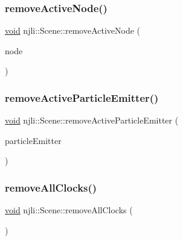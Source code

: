\mbox{\label{classnjli_1_1_scene_a5a826df53ef02ccb6bdcd7969c186162}} 
\subsubsection{\texorpdfstring{remove\+Active\+Node()}{removeActiveNode()}}
{\footnotesize\ttfamily \mbox{\hyperlink{_thread_8h_af1e856da2e658414cb2456cb6f7ebc66}{void}} njli\+::\+Scene\+::remove\+Active\+Node (\begin{DoxyParamCaption}\item[{\mbox{\hyperlink{classnjli_1_1_node}{Node}} $\ast$}]{node }\end{DoxyParamCaption})\hspace{0.3cm}{\ttfamily [protected]}}

\mbox{\label{classnjli_1_1_scene_a09172111155b23406c7110982fbce2bc}} 
\subsubsection{\texorpdfstring{remove\+Active\+Particle\+Emitter()}{removeActiveParticleEmitter()}}
{\footnotesize\ttfamily \mbox{\hyperlink{_thread_8h_af1e856da2e658414cb2456cb6f7ebc66}{void}} njli\+::\+Scene\+::remove\+Active\+Particle\+Emitter (\begin{DoxyParamCaption}\item[{\mbox{\hyperlink{classnjli_1_1_particle_emitter}{Particle\+Emitter}} $\ast$}]{particle\+Emitter }\end{DoxyParamCaption})\hspace{0.3cm}{\ttfamily [protected]}}

\mbox{\label{classnjli_1_1_scene_a245ec2b188fb22f97e58d2bbca676424}} 
\subsubsection{\texorpdfstring{remove\+All\+Clocks()}{removeAllClocks()}}
{\footnotesize\ttfamily \mbox{\hyperlink{_thread_8h_af1e856da2e658414cb2456cb6f7ebc66}{void}} njli\+::\+Scene\+::remove\+All\+Clocks (\begin{DoxyParamCaption}{ }\end{DoxyParamCaption})}


